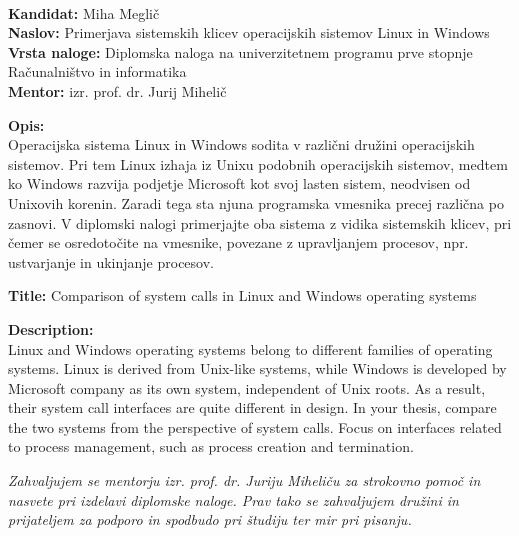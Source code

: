 \documentclass[a4paper,12pt,openright]{book}
\newcommand{\ttitle}{Primerjava sistemskih klicev operacijskih sistemov Linux in Windows}
\newcommand{\ttitleEn}{Comparison of system calls in Linux and Windows operating systems}
\newcommand{\tauthor}{Miha Meglič}
\newcommand{\clearemptydoublepage}{\newpage{\pagestyle{empty}\cleardoublepage}}
\begin{document}
\clearemptydoublepage

\thispagestyle{empty}
\
\vfill

\bigskip
\noindent\textbf{Kandidat:} \tauthor\\
\noindent\textbf{Naslov:} \ttitle\\
\noindent\textbf{Vrsta naloge:} Diplomska naloga na univerzitetnem programu prve stopnje Računalništvo in informatika \\
\noindent\textbf{Mentor:} izr. prof. dr. Jurij Mihelič

\bigskip
\noindent\textbf{Opis:}\\
Operacijska sistema Linux in Windows sodita v različni družini operacijskih sistemov.
Pri tem Linux izhaja iz Unixu podobnih operacijskih sistemov, medtem ko Windows razvija podjetje Microsoft kot svoj lasten sistem, neodvisen od Unixovih korenin.
Zaradi tega sta njuna programska vmesnika precej različna po zasnovi.
V diplomski nalogi primerjajte oba sistema z vidika sistemskih klicev, pri čemer se osredotočite na vmesnike, povezane z upravljanjem procesov, npr. ustvarjanje in ukinjanje procesov.

\bigskip
\noindent\textbf{Title:} \ttitleEn

\bigskip
\noindent\textbf{Description:}\\
Linux and Windows operating systems belong to different families of operating systems.
Linux is derived from Unix-like systems, while Windows is developed by Microsoft company as its own system, independent of Unix roots.
As a result, their system call interfaces are quite different in design.
In your thesis, compare the two systems from the perspective of system calls.
Focus on interfaces related to process management, such as process creation and termination.

\vfill



\vspace{2cm}

\clearemptydoublepage

\thispagestyle{empty}\mbox{}\vfill\null\it%
\noindent
Zahvaljujem se mentorju izr. prof. dr. Juriju Miheliču za strokovno pomoč in nasvete pri izdelavi diplomske naloge.
Prav tako se zahvaljujem družini in prijateljem za podporo in spodbudo pri študiju ter mir pri pisanju.
\rm\normalfont

\clearemptydoublepage
\end{document}
